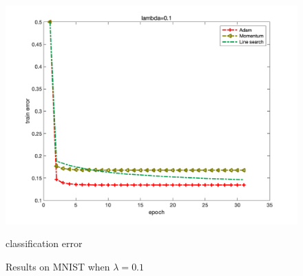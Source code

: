 \documentclass{article}
\begin{document}
\begin{figure}[H]
\begin{minipage}{0.33\linewidth}
		\includegraphics[width=1\linewidth]{./fig/err_m3}
		\caption{classification error}
	\end{minipage}
	\caption*{Results on MNIST when $\lambda=0.1$}
\end{figure}
\end{document}
